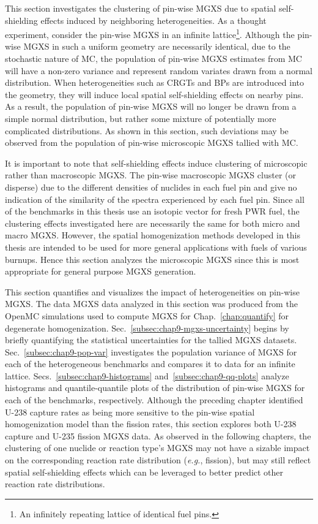 This section investigates the clustering of pin-wise \ac{MGXS} due to spatial self-shielding effects induced by neighboring heterogeneities. As a thought experiment, consider the pin-wise \ac{MGXS} in an infinite lattice\footnote{An infinitely repeating lattice of identical fuel pins.}. Although the pin-wise \ac{MGXS} in such a uniform geometry are necessarily identical, due to the stochastic nature of \ac{MC}, the population of pin-wise \ac{MGXS} estimates from \ac{MC} will have a non-zero variance and represent random variates drawn from a normal distribution. When heterogeneities such as \acp{CRGT} and \acp{BP} are introduced into the geometry, they will induce local spatial self-shielding effects on nearby pins. As a result, the population of pin-wise \ac{MGXS} will no longer be drawn from a simple normal distribution, but rather some mixture of potentially more complicated distributions. As shown in this section, such deviations may be observed from the population of pin-wise microscopic \ac{MGXS} tallied with \ac{MC}.

It is important to note that self-shielding effects induce clustering of microscopic rather than macroscopic \ac{MGXS}. The pin-wise macroscopic \ac{MGXS} cluster (or disperse) due to the different densities of nuclides in each fuel pin and give no indication of the similarity of the spectra experienced by each fuel pin. Since all of the benchmarks in this thesis use an isotopic vector for fresh \ac{PWR} fuel, the clustering effects investigated here are necessarily the same for both micro and macro \ac{MGXS}. However, the spatial homogenization methods developed in this thesis are intended to be used for more general applications with fuels of various burnups. Hence this section analyzes the microscopic \ac{MGXS} since this is most appropriate for general purpose \ac{MGXS} generation.

This section quantifies and visualizes the impact of heterogeneities on pin-wise \ac{MGXS}. The data \ac{MGXS} data analyzed in this section was produced from the OpenMC simulations used to compute \ac{MGXS} for Chap.~\ref{chap:quantify} for degenerate homogenization. Sec.~\ref{subsec:chap9-mgxs-uncertainty} begins by briefly quantifying the statistical uncertainties for the tallied \ac{MGXS} datasets. Sec.~\ref{subsec:chap9-pop-var} investigates the population variance of \ac{MGXS} for each of the heterogeneous benchmarks and compares it to data for an infinite lattice. Secs.~\ref{subsec:chap9-histograms} and~\ref{subsec:chap9-qq-plots} analyze histograms and quantile-quantile plots of the distribution of pin-wise \ac{MGXS} for each of the benchmarks, respectively. Although the preceding chapter identified U-238 capture rates as being more sensitive to the pin-wise spatial homogenization model than the fission rates, this section explores both U-238 capture and U-235 fission \ac{MGXS} data. As observed in the following chapters, the clustering of one nuclide or reaction type's \ac{MGXS} may not have a sizable impact on the corresponding reaction rate distribution (\textit{e.g.}, fission), but may still reflect spatial self-shielding effects which can be leveraged to better predict other reaction rate distributions.

